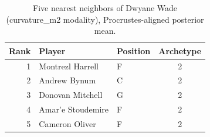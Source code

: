 \begin{table}[htbp]
  \centering\small
  \begin{tabular}{rllc}
    \toprule
    Rank & Player & Position & Archetype \\
    \midrule
    1 & Montrezl Harrell & F & 2 \\
    2 & Andrew Bynum & C & 2 \\
    3 & Donovan Mitchell & G & 2 \\
    4 & Amar'e Stoudemire & F & 2 \\
    5 & Cameron Oliver & F & 2 \\
    \bottomrule
  \end{tabular}
  \caption{Five nearest neighbors of Dwyane Wade (curvature_m2 modality), Procrustes-aligned posterior mean.}
  \label{tab:Dwyane_Wade_neighbors_curvature_m2}
\end{table}

